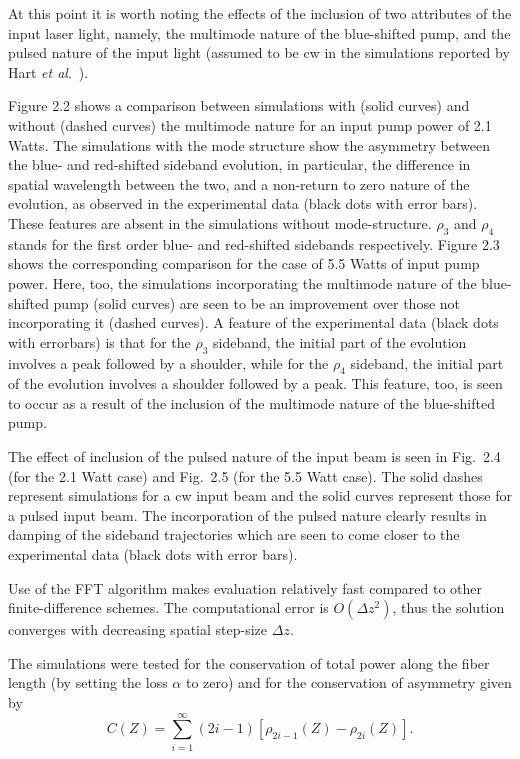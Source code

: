 At this point it is worth noting the effects of the inclusion of two attributes of
the input laser light, namely, the multimode nature of the blue-shifted pump, and
the pulsed nature of the input light (assumed to be cw in the simulations reported by
Hart {\it et al}.\ \cite{hart1}).

Figure 2.2 shows a comparison between simulations with (solid curves) and without (dashed curves) the multimode nature for an input pump power of 2.1 Watts. The simulations with the mode structure show the asymmetry between the blue- and red-shifted sideband evolution, in particular, the difference in spatial wavelength between the two, and a non-return to zero nature of the evolution, as observed in the experimental data (black dots with error bars). These features are absent in the simulations without mode-structure. $\rho_3$ and $\rho_4$ stands for the first order blue- and red-shifted sidebands respectively.  Figure 2.3 shows the corresponding comparison for the case of 5.5 Watts of input pump power.  Here, too, the simulations incorporating the multimode nature of the blue-shifted pump (solid curves) are seen to be an improvement over those not incorporating it (dashed curves). A feature of the experimental data (black dots with errorbars) is that for the $\rho_3$ sideband, the initial part of the evolution involves a peak followed by a shoulder, while for the $\rho_4$ sideband, the initial part of the evolution involves a shoulder followed by a peak. This feature, too, is seen to occur as a result of the inclusion of the multimode nature of the blue-shifted pump.

The effect of inclusion of the pulsed nature of the input beam is seen in Fig.\ 2.4 (for the 2.1 Watt case) and Fig.\ 2.5 (for the 5.5 Watt case). The solid dashes represent simulations for a cw input beam and the solid curves represent those for a pulsed input beam. The incorporation of the pulsed nature clearly results in damping of the sideband trajectories which are seen to come closer to the experimental data \cite{hart1} (black dots with error bars).

Use of the FFT algorithm makes evaluation relatively fast compared to other
finite-difference schemes. The computational error is $O(\Delta z^2)$, thus
the solution converges with decreasing spatial step-size $\Delta z$.

The simulations were tested for the conservation of total power along the
fiber length (by setting the loss $\alpha$ to zero) and for the conservation
of asymmetry \cite{thompson1,hart1} given by
\begin{equation}
C(Z) = \sum_{i=1}^{\infty}(2i-1)[\rho_{2i-1}(Z)-\rho_{2i}(Z)] .
\end{equation}

